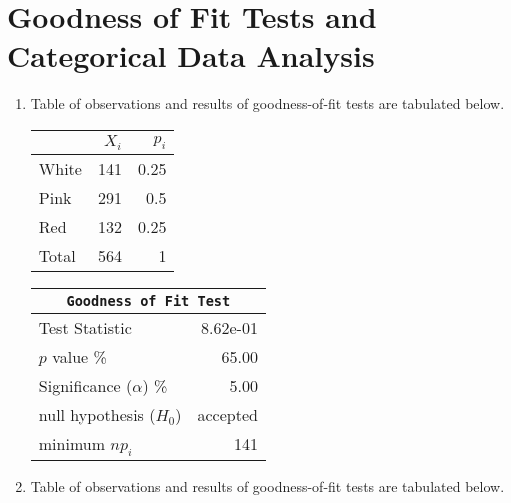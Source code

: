 \chapter{Goodness of Fit Tests and Categorical Data Analysis}

\begin{enumerate}
	
	\item Table of observations and results of goodness-of-fit tests are tabulated below.\\
	
	\begin{table}[H]
		\centering
		\begin{minipage}{0.4\textwidth}
			\centering
			\begin{tabular}{@{}lrr@{}}
				\toprule
				{} & $X_i$ & $p_i$ \\
				\midrule
				White &   141 &  0.25 \\
				Pink  &   291 &   0.5 \\
				Red   &   132 &  0.25 \\
				\midrule
				Total &   564 &     1 \\
				\bottomrule
			\end{tabular}
			
		\end{minipage}
		\begin{minipage}{0.4\textwidth}
			\centering
			\begin{tabular}{@{}lr@{}}
				\toprule
				\multicolumn{2}{c}{\texttt{Goodness of Fit Test}} \\
				\midrule
				Test Statistic             &  8.62e-01 \\
				$p$ value \%               &     65.00 \\
				Significance ($\alpha$) \% &      5.00 \\
				null hypothesis ($H_0$)    &  accepted \\
				minimum $n p_i$            &       141 \\
				\bottomrule
			\end{tabular}
			
		\end{minipage}
	\end{table}
	\bigskip
	
	\item Table of observations and results of goodness-of-fit tests are tabulated below.\\
	

\end{enumerate}
